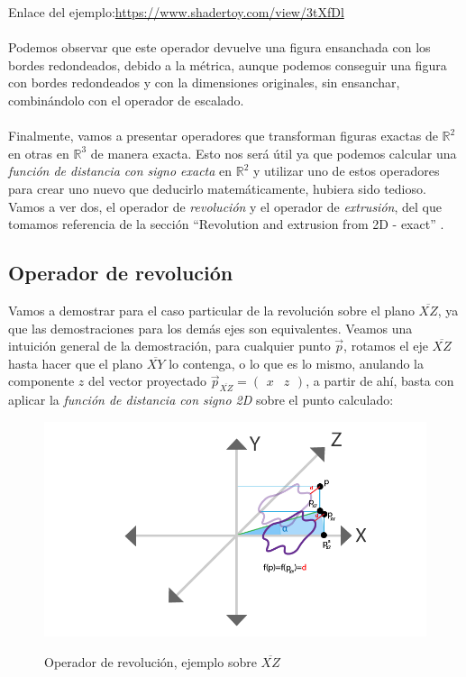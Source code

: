 Enlace del ejemplo:\url{https://www.shadertoy.com/view/3tXfDl}\\\\
Podemos observar que este operador devuelve una figura ensanchada con los bordes redondeados, debido a la métrica, aunque podemos conseguir una figura con bordes redondeados y con la dimensiones originales, sin ensanchar, combinándolo con el operador de escalado.\\\\
Finalmente, vamos a presentar operadores que transforman figuras exactas de \(\mathbb{R}^2\) en otras en \(\mathbb{R}^3\) de manera exacta. Esto nos será útil ya que podemos calcular una \textit{función de distancia con signo exacta} en \(\mathbb{R}^2\) y utilizar uno de estos operadores para crear uno nuevo que deducirlo matemáticamente, hubiera sido tedioso. Vamos a ver dos, el operador de \textit{revolución} y el operador de \textit{extrusión}, del que tomamos referencia de la sección \enquote{Revolution and extrusion from 2D - exact} \cite{3ddistinigo}.

\subsection{Operador de revolución}
Vamos a demostrar para el caso particular de la revolución sobre el plano \(\overline{XZ}\), ya que las demostraciones para los demás ejes son equivalentes. Veamos una intuición general de la demostración, para cualquier punto \(\Vec{p}\), rotamos el eje \(\overline{XZ}\) hasta hacer que el plano \(\overline{XY}\) lo contenga, o lo que es lo mismo, anulando la componente \(z\) del vector proyectado  \(\Vec{p}_{\overline{XZ}}=\begin{pmatrix}
    x& z
\end{pmatrix}\), a partir de ahí, basta con aplicar la \textit{función de distancia con signo 2D} sobre el punto calculado:

\begin{figure}[H]
  \centering
  \captionsetup{justification=centering}%
  \includegraphics[width=1.0\textwidth]{secciones/imagenes/sdf/proofs/proof_revolution.png}\label{fig:capsula}
  \caption{Operador de revolución, ejemplo sobre \(\overline{XZ}\)}
\end{figure}

